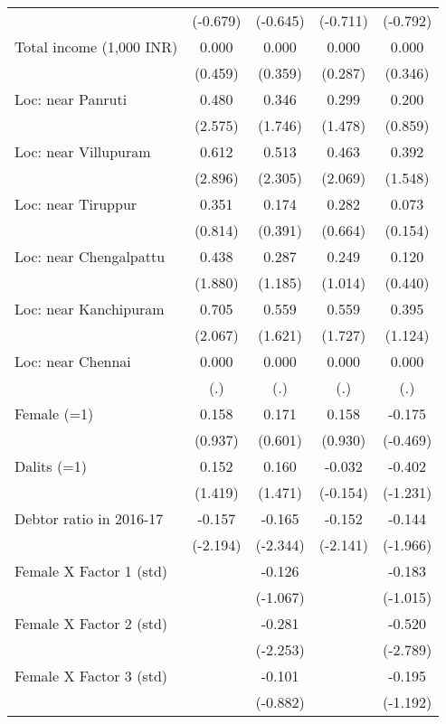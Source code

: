 \begin{longtable}{lcccc}
          & (-0.679) & (-0.645) & (-0.711) & (-0.792) \\
    Total income (1,000 INR) & 0.000 & 0.000 & 0.000 & 0.000 \\
          & (0.459) & (0.359) & (0.287) & (0.346) \\
    Loc: near Panruti & 0.480 & 0.346 & 0.299 & 0.200 \\
          & (2.575) & (1.746) & (1.478) & (0.859) \\
    Loc: near Villupuram & 0.612 & 0.513 & 0.463 & 0.392 \\
          & (2.896) & (2.305) & (2.069) & (1.548) \\
    Loc: near Tiruppur & 0.351 & 0.174 & 0.282 & 0.073 \\
          & (0.814) & (0.391) & (0.664) & (0.154) \\
    Loc: near Chengalpattu & 0.438 & 0.287 & 0.249 & 0.120 \\
          & (1.880) & (1.185) & (1.014) & (0.440) \\
    Loc: near Kanchipuram & 0.705 & 0.559 & 0.559 & 0.395 \\
          & (2.067) & (1.621) & (1.727) & (1.124) \\
    Loc: near Chennai & 0.000 & 0.000 & 0.000 & 0.000 \\
          & (.)   & (.)   & (.)   & (.) \\
    Female (=1) & 0.158 & 0.171 & 0.158 & -0.175 \\
          & (0.937) & (0.601) & (0.930) & (-0.469) \\
    Dalits (=1) & 0.152 & 0.160 & -0.032 & -0.402 \\
          & (1.419) & (1.471) & (-0.154) & (-1.231) \\
    Debtor ratio in 2016-17 & -0.157 & -0.165 & -0.152 & -0.144 \\
          & (-2.194) & (-2.344) & (-2.141) & (-1.966) \\
    Female X Factor 1 (std) &       & -0.126 &       & -0.183 \\
          &       & (-1.067) &       & (-1.015) \\
    Female X Factor 2 (std) &       & -0.281 &       & -0.520 \\
          &       & (-2.253) &       & (-2.789) \\
    Female X Factor 3 (std) &       & -0.101 &       & -0.195 \\
          &       & (-0.882) &       & (-1.192) \\

\end{longtable}
